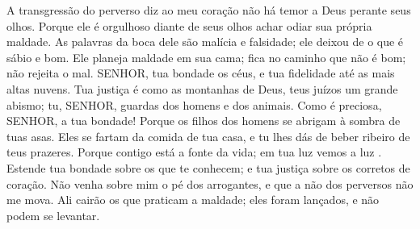 
{\PP 
  A transgressão do perverso diz ao meu coração
{} não há temor a Deus perante seus olhos.
  Porque ele é
{} orgulhoso diante de seus olhos
{} achar
{} odiar sua própria maldade.
  As palavras da boca dele são malícia e falsidade; ele deixou de
{} o que é sábio e bom.
  Ele planeja maldade em sua cama; fica no caminho que não é bom; não rejeita o mal.
  SENHOR, tua bondade
{} os céus, e tua fidelidade
{} até as mais altas nuvens.
  Tua justiça é como as montanhas de Deus, teus juízos
{} um grande abismo; tu, SENHOR, guardas
{} dos homens e dos animais.
  Como é preciosa, SENHOR, a tua bondade! Porque os filhos dos homens se abrigam à sombra de tuas asas.
  Eles se fartam da comida de tua casa, e tu lhes dás de beber
{} ribeiro de teus prazeres.
  Porque contigo está a fonte da vida; em tua luz vemos a luz
{} .
  Estende tua bondade sobre os que te conhecem; e tua justiça sobre os corretos de coração.
  Não venha sobre mim o pé dos arrogantes, e que a não dos perversos não me mova.
  Ali cairão os que praticam a maldade; eles foram lançados, e não podem se levantar.
\par }


